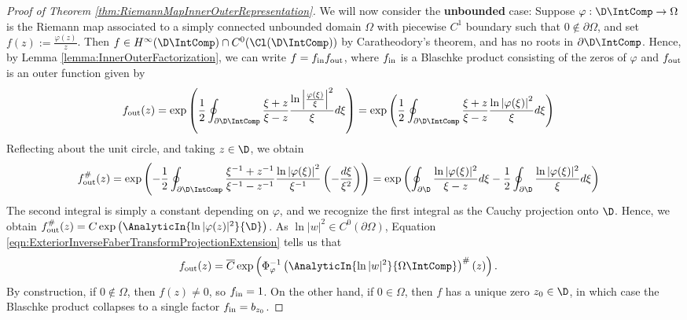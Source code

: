 \documentclass{article}
\numberwithin{equation}{section}
\begin{document}
\begin{proof}[Proof of Theorem \ref{thm:RiemannMapInnerOuterRepresentation}]
We will now consider the {\bf unbounded} case: Suppose $\varphi:\D\IntComp\rightarrow\Omega$ is the Riemann map associated to a simply connected unbounded domain $\Omega$ with piecewise $C^1$ boundary such that $0\notin\partial\Omega$, and set $f(z):=\frac{\varphi(z)}{z}$. Then $f\in H^{\infty}(\D\IntComp)\cap C^0(\Cl(\D\IntComp))$ by Caratheodory's theorem, and has no roots in $\partial\D\IntComp$. Hence, by Lemma \ref{lemma:InnerOuterFactorization}, we can write $f=f_{\rm in}f_{\rm out}$, where $f_{\rm in}$ is a Blaschke product consisting of the zeros of $\varphi$ and $f_{\rm out}$ is an outer function given by
\begin{align*}
    f_{\rm out}(z)&=\exp\left(\dfrac{1}{2}\oint_{\partial\D\IntComp}\dfrac{\xi+z}{\xi-z}\dfrac{\ln\left|\frac{\varphi(\xi)}{\xi}\right|^2}{\xi}d\xi\right)=\exp\left(\dfrac{1}{2}\oint_{\partial\D\IntComp}\dfrac{\xi+z}{\xi-z}\dfrac{\ln\left|\varphi(\xi)\right|^2}{\xi}d\xi\right)
\end{align*}
Reflecting about the unit circle, and taking $z\in\D$, we obtain
\begin{align*}
    f_{\rm out}^{\#}(z)&=\exp\left(-\dfrac{1}{2}\oint_{\partial\D\IntComp}\dfrac{\xi^{-1}+z^{-1}}{\xi^{-1}-z^{-1}}\dfrac{\ln\left|\varphi(\xi)\right|^2}{\xi^{-1}}\left(-\dfrac{d\xi}{\xi^2}\right)\right)=\exp\left(\oint_{\partial\D}\dfrac{\ln|\varphi(\xi)|^2}{\xi-z}d\xi-\dfrac{1}{2}\oint_{\partial\D}\dfrac{\ln|\varphi(\xi)|^2}{\xi}d\xi\right)
\end{align*}
The second integral is simply a constant depending on $\varphi$, and we recognize the first integral as the Cauchy projection onto $\D$. Hence, we obtain $f_{\rm out}^{\#}(z)=C\exp\left(\AnalyticIn{\ln|\varphi(z)|^2}{\D}\right)$. As $\ln|w|^2\in C^0(\partial\Omega)$, Equation \ref{eqn:ExteriorInverseFaberTransformProjectionExtension} tells us that
\begin{align*}
    f_{\rm out}(z)&=\overline{C}\exp\left(\Phi_{\varphi}^{-1}\left(\AnalyticIn{\ln|w|^2}{\Omega\IntComp}\right)^{\#}(z)\right).
\end{align*}
By construction, if $0\notin\Omega$, then $f(z)\neq0$, so $f_{\rm in}=1$. On the other hand, if $0\in\Omega$, then $f$ has a unique zero $z_0\in\D$, in which case the Blaschke product collapses to a single factor $f_{\rm in}=b_{z_0}$.
\end{proof}
\end{document}
